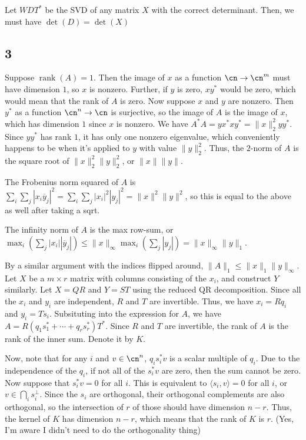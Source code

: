 \documentclass{article}
\newcommand{\conj}{\overline}
\DeclareMathOperator{\rank}{rank}
\begin{document}
Let $WDT^*$ be the SVD of any matrix $X$ with the correct determinant. Then, we must have $\det(D)=\det(X)$ 
\subsection*{3}
Suppose $\rank(A)=1$. Then the image of $x$ as a function $\cn\to\cn^m$ must have dimension $1$, so $x$ is nonzero. Further, if $y$ is zero, $xy^*$ would be zero, which would mean that the rank of $A$ is zero. Now suppose $x$ and $y$ are nonzero. Then $y^*$ as a function $\cn^n\to\cn$ is surjective, so the image of $A$ is the image of $x$, which has dimension $1$ since $x$ is nonzero.
We have $A^*A=yx^*xy^*=\|x\|_2^2yy^*$. Since $yy^*$ has rank $1$, it has only one nonzero eigenvalue, which conveniently happens to be when it's applied to $y$ with value $\|y\|_2^2$. Thus, the $2$-norm of $A$ is the square root of $\|x\|^2_2\|y\|_2^2$, or $\|x\|\|y\|$. 

The Frobenius norm squared of $A$ is $\sum_i\sum_j|x_i\conj{y}_j|^2=\sum_i\sum_j|x_i|^2|y_j|^2=\|x\|^2\|y\|^2$, so this is equal to the above as well after taking a sqrt.

The infinity norm of $A$ is the max row-sum, or $\max_i\left(\sum_j|x_i||\conj{y}_j|\right)\leq\|x\|_\infty\max_i\left(\sum_j|y_j|\right)=\|x\|_\infty\|y\|_1$.

By a similar argument with the indices flipped around, $\|A\|_1\leq\|x\|_1\|y\|_\infty$.
Let $X$ be a $m\times r$ matrix with columns consisting of the $x_i$, and construct $Y$ similarly. Let $X=QR$ and $Y=ST$ using the reduced QR decomposition. Since all the $x_i$ and $y_i$ are independent, $R$ and $T$ are invertible. Thus, we have $x_i=Rq_i$ and $y_i=Ts_i$. Subsituting into the expression for $A$, we have $A=R(q_1s_1^*+\cdots+q_rs_r^*)T^*$. Since $R$ and $T$ are invertible, the rank of $A$ is the rank of the inner sum. Denote it by $K$. 

Now, note that for any $i$ and $v\in\cn^n$, $q_is_i^*v$ is a scalar multiple of $q_i$. Due to the independence of the $q_i$, if not all of the $s_i^*v$ are zero, then the sum cannot be zero. Now suppose that $s_i^*v=0$ for all $i$. This is equivalent to $\langle s_i,v\rangle=0$ for all $i$, or $v\in\bigcap_is_i^\perp$. Since the $s_i$ are orthogonal, their orthogonal complements are also orthogonal, so the intersection of $r$ of those should have dimension $n-r$. Thus, the kernel of $K$ has dimension $n-r$, which means that the rank of $K$ is $r$. (Yes, I'm aware I didn't need to do the orthogonality thing)
\end{document}
